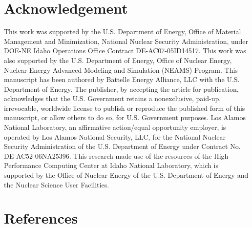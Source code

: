 \documentclass[10pt,review]{elsarticle}
\begin{document}
\section{Acknowledgement}
This work was supported by the U.S. Department of Energy, Office of Material Management and Minimization, National Nuclear Security Administration, under DOE-NE Idaho Operations Office Contract DE-AC07-05ID14517. This work was also supported by the U.S. Department of Energy, Office of Nuclear Energy, Nuclear Energy Advanced Modeling and Simulation (NEAMS) Program. This manuscript has been authored by Battelle Energy Alliance, LLC with the U.S. Department of Energy. The publisher, by accepting the article for publication, acknowledges that the U.S. Government retains a nonexclusive, paid-up, irrevocable, worldwide license to publish or reproduce the published form of this manuscript, or allow others to do so, for U.S. Government purposes. Los Alamos National Laboratory, an affirmative action/equal opportunity employer, is operated by Los Alamos National Security, LLC, for the National Nuclear Security Administration of the U.S. Department of Energy under Contract No. DE-AC52-06NA25396. This research made use of the resources of the High Performance Computing Center at Idaho National Laboratory, which is supported by the Office of Nuclear Energy of the U.S. Department of Energy and the Nuclear Science User Facilities.

\section{References}


\end{document}
